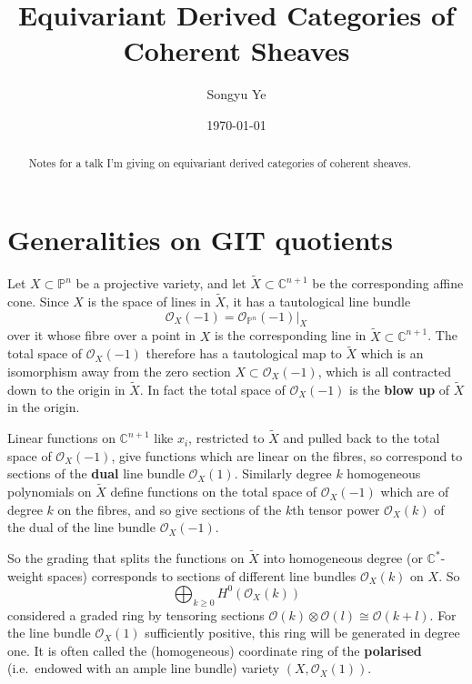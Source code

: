 \documentclass[12pt]{article}
\begin{document}
\rhead{\today}
\cfoot{\thepage}

\title{Equivariant Derived Categories of Coherent Sheaves}

\author{Songyu Ye}
\date{\today}
\maketitle


\begin{abstract}
  Notes for a talk I'm giving on equivariant derived categories of coherent sheaves.
\end{abstract}

\tableofcontents


\section{Generalities on GIT quotients}
Let $X \subset \mathbb{P}^n$ be a projective variety, and let $\widetilde{X} \subset \mathbb{C}^{n+1}$ be the corresponding affine cone.
Since $X$ is the space of lines in $\widetilde{X}$, it has a tautological line bundle
\[
  \mathcal{O}_X(-1) = \mathcal{O}_{\mathbb{P}^n}(-1)\big|_X
\]
over it whose fibre over a point in $X$ is the corresponding line in
$\widetilde{X} \subset \mathbb{C}^{n+1}$. The total space of $\mathcal{O}_X(-1)$ therefore
has a tautological map to $\widetilde{X}$ which is an isomorphism away from the zero section
$X \subset \mathcal{O}_X(-1)$, which is all contracted down to the origin in $\widetilde{X}$.
In fact the total space of $\mathcal{O}_X(-1)$ is the \textbf{blow up} of $\widetilde{X}$ in the origin.

Linear functions on $\mathbb{C}^{n+1}$ like $x_i$, restricted to $\widetilde{X}$ and pulled
back to the total space of $\mathcal{O}_X(-1)$, give functions which are linear on the fibres,
so correspond to sections of the \textbf{dual} line bundle $\mathcal{O}_X(1)$. Similarly degree $k$
homogeneous polynomials on $\widetilde{X}$ define functions on the total space of $\mathcal{O}_X(-1)$
which are of degree $k$ on the fibres, and so give sections of the $k$th tensor power
$\mathcal{O}_X(k)$ of the dual of the line bundle $\mathcal{O}_X(-1)$.

So the grading that splits the functions on $\widetilde{X}$ into homogeneous degree
(or $\mathbb{C}^*$-weight spaces) corresponds to sections of different line bundles $\mathcal{O}_X(k)$
on $X$. So
\[
  \bigoplus_{k \ge 0} H^0(\mathcal{O}_X(k))
\]
considered a graded ring by tensoring sections
$\mathcal{O}(k) \otimes \mathcal{O}(l) \cong \mathcal{O}(k+l)$. For the line bundle $\mathcal{O}_X(1)$
sufficiently positive, this ring will be generated in degree one. It is often called the
(homogeneous) coordinate ring of the \textbf{polarised} (i.e.~endowed with an ample line bundle)
variety $(X,\mathcal{O}_X(1))$.
\end{document}
